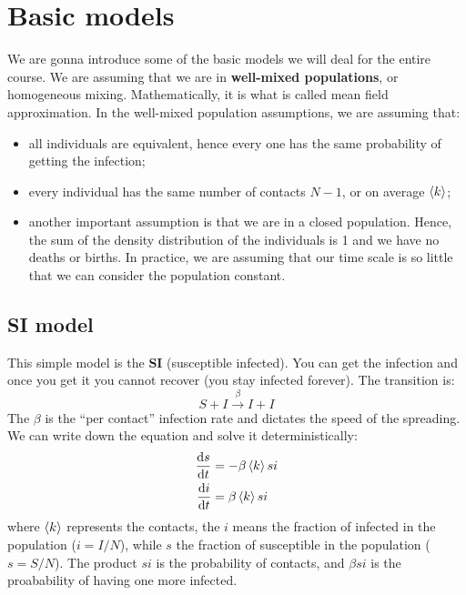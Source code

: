 \documentclass[../main/main.tex]{subfiles}
\begin{document}

\section{Basic models}

We are gonna introduce some of the basic models we will deal for the entire course.
We are assuming that we are in \textbf{well-mixed populations}, or homogeneous mixing. Mathematically, it is what is called mean field approximation.
In the well-mixed population assumptions, we are assuming that:
\begin{itemize}
\item all individuals are equivalent, hence every one has the same probability of getting the infection;
\item every individual has the same number of contacts \( N-1 \), or on average \( \expval{k}  \);
\item another important assumption is that we are in a closed population. Hence, the sum of the density distribution of the individuals is 1 and we have no deaths or births. In practice, we are assuming that our time scale is so little that we can consider the population constant.
\end{itemize}

\subsection{SI model}

This simple model is the \textbf{SI} (susceptible infected). You can get the infection and once you get it you cannot recover (you stay infected forever).
The transition is:
\begin{equation}
  S + I \overset{\beta }{\rightarrow} I + I
\end{equation}
The \( \beta  \) is the “per contact” infection rate and dictates the speed of the spreading. We can write down the equation and solve it deterministically:
\begin{equation}
\begin{split}
  \dv{s}{t} &= - \beta \expval{k} s i \\ \dv{i}{t} &= \beta \expval{k} s i
\end{split}
\end{equation}
where \( \expval{k}  \) represents the contacts, the \( i \) means the fraction of infected in the population (\( i=I/N \)), while \( s \) the fraction of susceptible in the population (\( s=S/N \)).
The product \( s i \) is the probability of contacts, and \( \beta  s i \) is the proabability of having one more infected.
\end{document}
